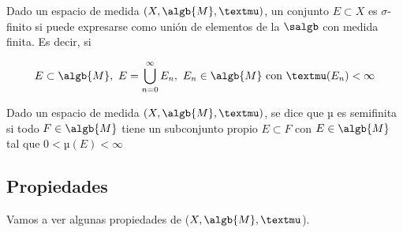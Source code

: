 \documentclass{apuntes}
\begin{document}
\begin{defn}
Dado un espacio de medida $(X, \algb{M}, µ)$, un conjunto $E \subset X$ es $\sigma$-finito si puede expresarse como unión de elementos de la $\salgb$ con medida finita. Es decir, si

\[E\subset \algb{M}, \ E=\bigcup_{n=0}^{\infty} E_n, \ E_n \in \algb{M} \text{ con} \ µ(E_n)< \infty\]
\end{defn}

\begin{defn}
Dado un espacio de medida $(X, \algb{M}, µ)$, se dice que µ es semifinita si todo $F\in \algb{M}$ tiene un subconjunto propio $E\subset F$ con $E\in \algb{M}$ tal que $0<µ(E) < \infty$

\end{defn}

\subsection{Propiedades}
Vamos a ver algunas propiedades de ($X, \algb{M}, µ$).
\end{document}
